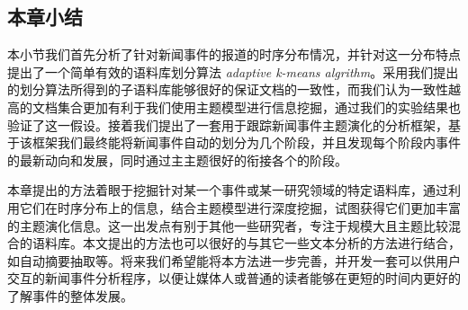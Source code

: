\subsection{本章小结}
本小节我们首先分析了针对新闻事件的报道的时序分布情况，并针对这一分布特点提出了一个简单有效的语料库划分算法 \emph{adaptive k-means algrithm}。采用我们提出的划分算法所得到的子语料库能够很好的保证文档的一致性，而我们认为一致性越高的文档集合更加有利于我们使用主题模型进行信息挖掘，通过我们的实验结果也验证了这一假设。接着我们提出了一套用于跟踪新闻事件主题演化的分析框架，基于该框架我们最终能将新闻事件自动的划分为几个阶段，并且发现每个阶段内事件的最新动向和发展，同时通过主主题很好的衔接各个的阶段。

本章提出的方法着眼于挖掘针对某一个事件或某一研究领域的特定语料库，通过利用它们在时序分布上的信息，结合主题模型进行深度挖掘，试图获得它们更加丰富的主题演化信息。这一出发点有别于其他一些研究者，专注于规模大且主题比较混合的语料库。本文提出的方法也可以很好的与其它一些文本分析的方法进行结合，如自动摘要抽取等。将来我们希望能将本方法进一步完善，并开发一套可以供用户交互的新闻事件分析程序，以便让媒体人或普通的读者能够在更短的时间内更好的了解事件的整体发展。





